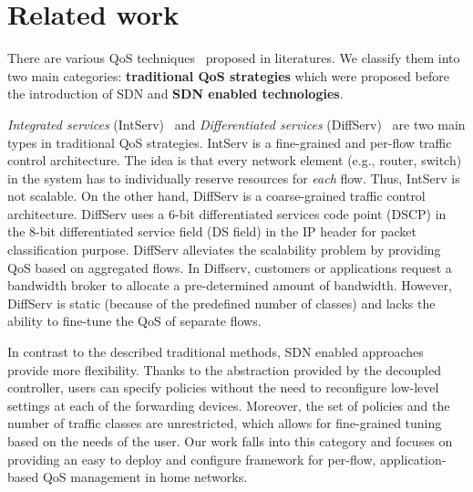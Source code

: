 \section{Related work}
\label{sect:related}

There are various QoS techniques~\cite{IntServ, DiffServ, Sharma_EWSDN14, Egilmez_ASPIPA12, bar_2013, Ishimori_EWSDN13, Raumer_2014} proposed in literatures. We classify them into two main
categories: \textbf{traditional QoS strategies} which were proposed before the introduction of SDN and
\textbf{SDN enabled technologies}.

\emph{Integrated services} (IntServ)~\cite{IntServ} and \emph{Differentiated services} (DiffServ)~\cite{DiffServ}
are two main types in traditional QoS strategies. IntServ is a fine-grained and per-flow traffic control architecture.
The idea is that every network element (e.g., router, switch) in the system has to individually reserve resources for
\emph{each} flow. Thus, IntServ is not scalable. On the other hand, DiffServ is a coarse-grained traffic control
architecture. DiffServ uses a 6-bit differentiated services code point (DSCP) in the 8-bit differentiated service field
(DS field) in the IP header for packet classification purpose. DiffServ alleviates the scalability problem by providing
QoS based on aggregated flows.  In Diffserv, customers or applications request a bandwidth broker to allocate a pre-determined
amount of bandwidth. However, DiffServ is static (because of the predefined number of classes) and lacks the ability to
fine-tune the QoS of separate flows.

In contrast to the described traditional methods, SDN enabled approaches provide more flexibility. Thanks to the abstraction
provided by the decoupled controller, users can specify policies without the need to reconfigure low-level settings at each
of the forwarding devices. Moreover, the set of policies and the number of traffic classes are unrestricted, which allows for
fine-grained tuning based on the needs of the user. Our work falls into this category and focuses on providing an easy to deploy
and configure framework for per-flow, application-based QoS management in home networks.


